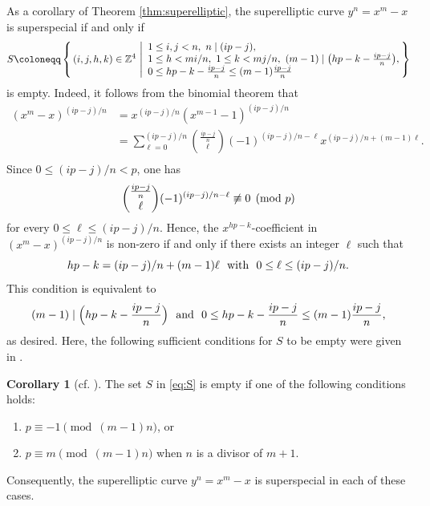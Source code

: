 \documentclass{article}
\theoremstyle{definition}
\newtheorem{Cor}[Def]{Corollary}
\begin{document}
As a corollary of Theorem \ref{thm:superelliptic}, the superelliptic curve $y^n = x^m-x$ is superspecial if and only if\vspace{-0.6mm}
\begin{equation}\label{eq:S}
    S \coloneqq \left\{
    \,(i,j,h,k) \in \mathbb{Z}^4\ \middle|
    \begin{array}{l}
        1 \leq i,j < n,\ n \mid (ip-j),\\[-0.2mm]
        1 \leq h < mi/n,\ 1 \leq k < mj/n,\ (m-1) \mid \bigl(hp-k - \frac{ip-j}{n}\bigr),\\
        0 \leq hp-k - \frac{ip-j}{n} \leq (m-1)\frac{ip-j}{n}
    \end{array}\hspace{-1mm}\right\}\vspace{-0.1mm}
\end{equation}
is empty.
Indeed, it follows from the binomial theorem that\vspace{-1mm}
\begin{align*}
    (x^m-x)^{(ip-j)/n} &= x^{(ip-j)/n}(x^{m-1}-1)^{(ip-j)/n}\\[-0.9mm]
    &= \sum_{\ell=0}^{(ip-j)/n}\binom{\frac{ip-j}{n}}{\ell}(-1)^{(ip-j)/n-\ell}x^{(ip-j)/n+(m-1)\ell}.\\[-6.1mm]
\end{align*}
Since $0 \leq (ip-j)/n < p$, one has\vspace{-2.2mm}
\[
    \binom{\frac{ip-j}{n}}{\ell}(-1)^{(ip-j)/n-\ell} \not\equiv 0 \pmod{p}\vspace{-0.3mm}
\]
for every $0 \leq \ell \leq (ip-j)/n$.
Hence, the $x^{hp-k}$-coefficient in $(x^m-x)^{(ip-j)/n}$ is non-zero if and only if there exists an integer $\ell$ such that\vspace{-1.2mm}
\[
    hp-k = (ip-j)/n + (m-1)\ell \ \text{ with }\ 0 \leq \ell \leq (ip-j)/n.\vspace{0.4mm}
\]
This condition is equivalent to\vspace{-1.3mm}
\[
    (m-1) \mid \Bigl(hp-k - \frac{ip-j}{n}\Bigr) \ \text{ and }\ 0 \leq hp-k - \frac{ip-j}{n} \leq (m-1)\frac{ip-j}{n},
\]
as desired.
Here, the following sufficient conditions for $S$ to be empty were given in \cite[Corollary 2.16]{Brock}.\vspace{-1.2mm}
\begin{Cor}[{cf. \cite[Corollary 2.16]{Brock}}]\label{cor:x^d-x}
The set $S$ in \eqref{eq:S} is empty if one of the following conditions holds:\vspace{-1.1mm}
\begin{enumerate}
\item[(i)] $p \equiv -1 \pmod{(m-1)n}$, or\vspace{-2.7mm}
\item[(ii)] $p \equiv m \pmod{(m-1)n}$ when $n$ is a divisor of $m+1$.\vspace{-0.6mm}
\end{enumerate}
Consequently, the superelliptic curve $y^n = x^m - x$ is superspecial in each of these cases.
\end{Cor}
\end{document}
